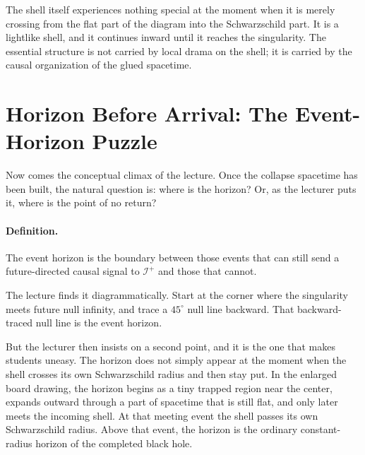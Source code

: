 The shell itself experiences nothing special at the moment when it is merely crossing from the flat part of the diagram into the Schwarzschild part. It is a lightlike shell, and it continues inward until it reaches the singularity. The essential structure is not carried by local drama on the shell; it is carried by the causal organization of the glued spacetime.

\section{Horizon Before Arrival: The Event-Horizon Puzzle}

Now comes the conceptual climax of the lecture. Once the collapse spacetime has been built, the natural question is: where is the horizon? Or, as the lecturer puts it, where is the point of no return?

\paragraph{Definition.} The event horizon is the boundary between those events that can still send a future-directed causal signal to \(\mathcal{I}^+\) and those that cannot.

The lecture finds it diagrammatically. Start at the corner where the singularity meets future null infinity, and trace a \(45^\circ\) null line backward. That backward-traced null line is the event horizon.

But the lecturer then insists on a second point, and it is the one that makes students uneasy. The horizon does not simply appear at the moment when the shell crosses its own Schwarzschild radius and then stay put. In the enlarged board drawing, the horizon begins as a tiny trapped region near the center, expands outward through a part of spacetime that is still flat, and only later meets the incoming shell. At that meeting event the shell passes its own Schwarzschild radius. Above that event, the horizon is the ordinary constant-radius horizon of the completed black hole.

